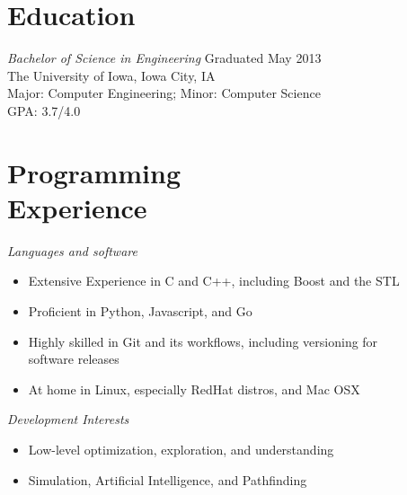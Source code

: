 \documentclass[line,margin]{res}
\begin{document}
\begin{resume}
		\section{Education}
            {\sl Bachelor of Science in Engineering} \hfill Graduated May 2013 \\
                The University of Iowa, Iowa City, IA \\
                Major: Computer Engineering; Minor: Computer Science \\ 
                GPA: 3.7/4.0    
            
    \section{Programming \\ Experience}
        {\sl Languages and software}
            \begin{itemize} \itemsep -2pt
                \item Extensive Experience in C and C++, including Boost and the STL
                \item Proficient in Python, Javascript, and Go
                \item Highly skilled in Git and its workflows, including versioning for \\
                      software releases
                \item At home in Linux, especially RedHat distros, and Mac OSX
            \end{itemize}
        {\sl Development Interests}
            \begin{itemize} \itemsep -2pt
                \item Low-level optimization, exploration, and understanding
                \item Simulation, Artificial Intelligence, and Pathfinding
            \end{itemize}
         

\end{resume}
\end{document}
